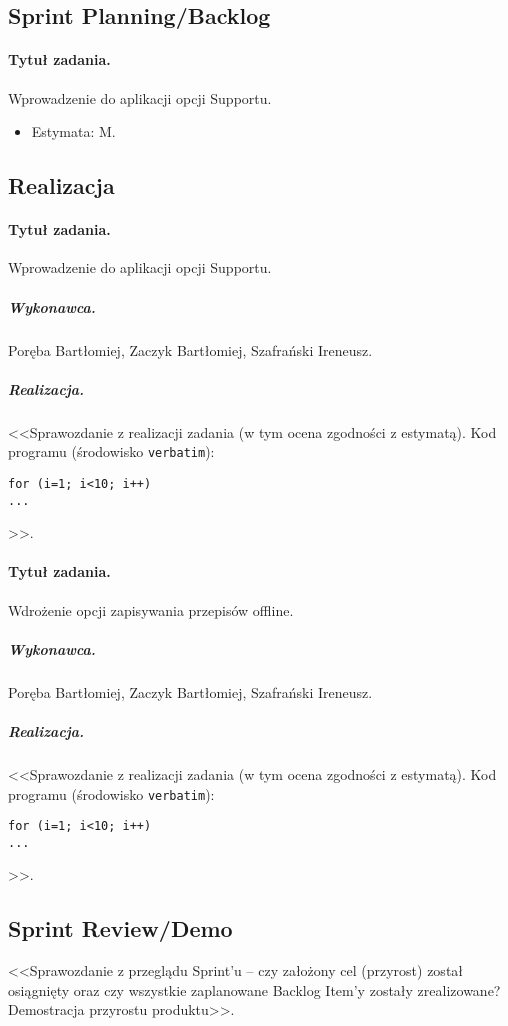 \documentclass[a4paper]{article}
\begin{document}
\subsection{Sprint Planning/Backlog}

\paragraph{Tytuł zadania.} Wprowadzenie do aplikacji opcji Supportu.
\begin{itemize}
	\item Estymata: M.
\end{itemize}


\subsection{Realizacja}

\paragraph{Tytuł zadania.} Wprowadzenie do aplikacji opcji Supportu.
\subparagraph{Wykonawca.} Poręba Bartłomiej, Zaczyk Bartłomiej, Szafrański Ireneusz.
\subparagraph{Realizacja.} <<Sprawozdanie z realizacji zadania (w tym ocena zgodności z estymatą). Kod programu (środowisko \texttt{verbatim}): \begin{verbatim}
for (i=1; i<10; i++)
...
\end{verbatim}>>.

\paragraph{Tytuł zadania.} Wdrożenie opcji zapisywania przepisów offline.
\subparagraph{Wykonawca.} Poręba Bartłomiej, Zaczyk Bartłomiej, Szafrański Ireneusz.
\subparagraph{Realizacja.} <<Sprawozdanie z realizacji zadania (w tym ocena zgodności z estymatą). Kod programu (środowisko \texttt{verbatim}): \begin{verbatim}
for (i=1; i<10; i++)
...
\end{verbatim}>>.


\subsection{Sprint Review/Demo}
<<Sprawozdanie z przeglądu Sprint'u -- czy założony cel (przyrost) został osiągnięty oraz czy wszystkie zaplanowane Backlog Item'y zostały zrealizowane? Demostracja przyrostu produktu>>.
\end{document}

